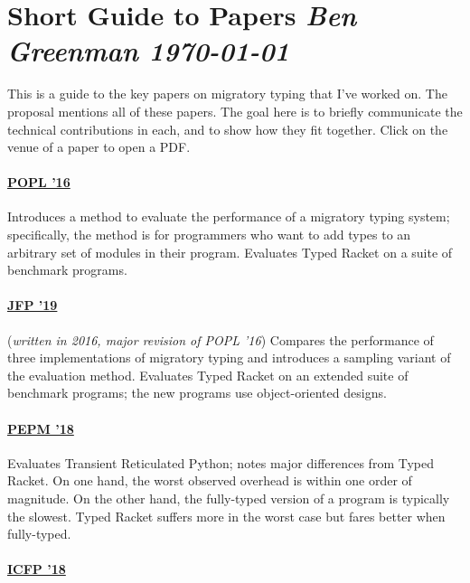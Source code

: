 \documentclass[10pt]{article}
\begin{document}

\nolinenumbers

\section*{Short Guide to Papers \hfill{\normalfont\small\it Ben Greenman \quad \today}}

This is a guide to the key papers on migratory typing that I've worked on.
The proposal mentions all of these papers.
The goal here is to briefly communicate the technical contributions in each,
 and to show how they fit together.
Click on the venue of a paper to open a PDF.

\bigskip
\hfill{}\decoone\hfill{}

\paragraph{\href{https://www2.ccs.neu.edu/racket/pubs/popl16-tfgnvf.pdf}{POPL '16}}
Introduces a method to evaluate the performance of a migratory typing system;
 specifically, the method is for programmers who want to add types
 to an arbitrary set of modules in their program.
Evaluates Typed Racket on a suite of benchmark programs.


\paragraph{\href{https://www2.ccs.neu.edu/racket/pubs/gtnffvf-jfp19.pdf}{JFP '19}}
(\emph{written in 2016, major revision of POPL '16}\/) \quad
Compares the performance of three implementations of migratory typing and
 introduces a sampling variant of the evaluation method.
Evaluates Typed Racket on an extended suite of benchmark programs;
 the new programs use object-oriented designs.


\paragraph{\href{https://www2.ccs.neu.edu/racket/pubs/pepm18-gm.pdf}{PEPM '18}}
Evaluates Transient Reticulated Python;
 notes major differences from Typed Racket.
On one hand, the worst observed overhead is within one order of magnitude.
On the other hand, the fully-typed version of a program is typically the slowest.
Typed Racket suffers more in the worst case but fares better when fully-typed.


\paragraph{\href{https://www2.ccs.neu.edu/racket/pubs/icfp18-gf.pdf}{ICFP '18}}
\end{document}
